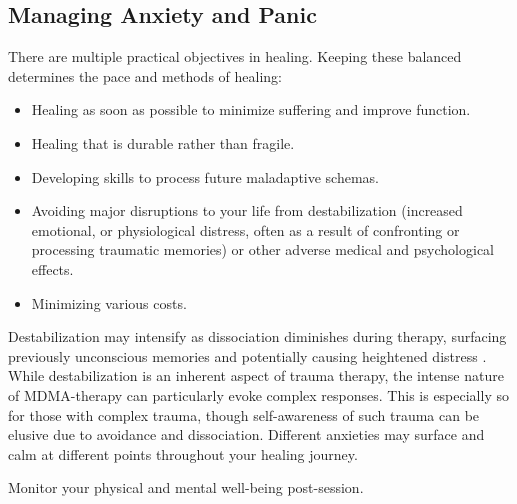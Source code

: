 \documentclass[12pt,letterpaper]{article}
\begin{document}
\subsection{Managing Anxiety and Panic}
\label{sectionManagement}
There are multiple practical objectives in healing. Keeping these balanced determines the pace and methods of healing: 
\begin{itemize}
    \item Healing as soon as possible to minimize suffering and improve function.
    \item Healing that is durable rather than fragile.
    \item Developing skills to process future maladaptive schemas.
    \item Avoiding major disruptions to your life from destabilization (increased emotional, or physiological distress, often as a result of confronting or processing traumatic memories) or other adverse medical and psychological effects.
    \item Minimizing various costs.
\end{itemize}
Destabilization may intensify as dissociation diminishes during therapy, surfacing previously unconscious memories and potentially causing heightened distress \cite{vanderKolkBody}. While destabilization is an inherent aspect of trauma therapy, the intense nature of MDMA-therapy can particularly evoke complex responses. This is especially so for those with complex trauma, though self-awareness of such trauma can be elusive due to avoidance and dissociation. Different anxieties may surface and calm at different points throughout your healing journey.

Monitor your physical and mental well-being post-session. 

\vspace{\baselineskip}
\end{document}
